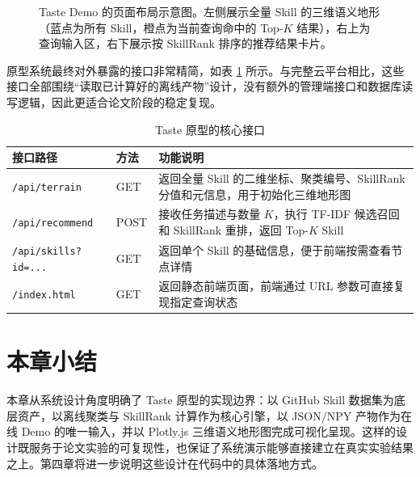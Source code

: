 \begin{figure}[htbp]
\caption{Taste Demo 的页面布局示意图。左侧展示全量 Skill 的三维语义地形（蓝点为所有 Skill，橙点为当前查询命中的 Top-$K$ 结果），右上为查询输入区，右下展示按 SkillRank 排序的推荐结果卡片。}
\label{fig:ui_layout}
\end{figure}

原型系统最终对外暴露的接口非常精简，如表 \ref{tab:api} 所示。与完整云平台相比，这些接口全部围绕“读取已计算好的离线产物”设计，没有额外的管理端接口和数据库读写逻辑，因此更适合论文阶段的稳定复现。

\begin{table}[htbp]
\centering
\caption{Taste 原型的核心接口}
\label{tab:api}
\begin{tabular}{llp{6.5cm}}
\toprule
接口路径 & 方法 & 功能说明 \\
\midrule
\texttt{/api/terrain} & GET & 返回全量 Skill 的二维坐标、聚类编号、SkillRank 分值和元信息，用于初始化三维地形图 \\
\texttt{/api/recommend} & POST & 接收任务描述与数量 $K$，执行 TF-IDF 候选召回和 SkillRank 重排，返回 Top-$K$ Skill \\
\texttt{/api/skills?id=...} & GET & 返回单个 Skill 的基础信息，便于前端按需查看节点详情 \\
\texttt{/index.html} & GET & 返回静态前端页面，前端通过 URL 参数可直接复现指定查询状态 \\
\bottomrule
\end{tabular}
\end{table}

\section{本章小结}
\label{sec:chap3_summary}

本章从系统设计角度明确了 Taste 原型的实现边界：以 GitHub Skill 数据集为底层资产，以离线聚类与 SkillRank 计算作为核心引擎，以 JSON/NPY 产物作为在线 Demo 的唯一输入，并以 Plotly.js 三维语义地形图完成可视化呈现。这样的设计既服务于论文实验的可复现性，也保证了系统演示能够直接建立在真实实验结果之上。第四章将进一步说明这些设计在代码中的具体落地方式。

